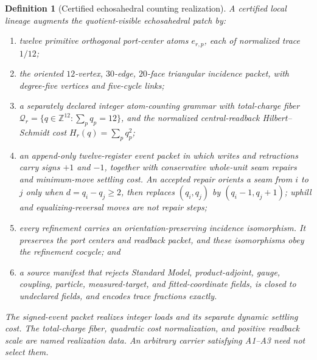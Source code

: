 \documentclass[11pt]{article}
\newtheorem{definition}[theorem]{Definition}
\theoremstyle{remark}
\theoremstyle{plain}
\begin{document}
\begin{definition}[Certified echosahedral counting realization]
\label{def:certified-echosahedral-lineage}
A certified local lineage augments the quotient-visible echosahedral patch by:
\begin{enumerate}[leftmargin=2em,label=\textup{(\roman*)}]
\item twelve primitive orthogonal port-center atoms \(e_{r,p}\), each of
normalized trace \(1/12\);
\item the oriented \(12\)-vertex, \(30\)-edge, \(20\)-face triangular
incidence packet, with degree-five vertices and five-cycle links;
\item a separately declared integer atom-counting grammar with total-charge
fiber \(\mathcal Q_r=\{q\in\mathbb Z^{12}:\sum_pq_p=12\}\), and the
normalized central-readback Hilbert--Schmidt cost
\(H_r(q)=\sum_pq_p^2\);
\item an append-only twelve-register event packet in which writes and
retractions carry signs \(+1\) and \(-1\), together with conservative
whole-unit seam repairs and minimum-move settling cost.  An accepted repair
orients a seam from \(i\) to \(j\) only when
\(d=q_i-q_j\ge2\), then replaces
\((q_i,q_j)\) by \((q_i-1,q_j+1)\); uphill and equalizing-reversal moves are
not repair steps;
\item every refinement carries an orientation-preserving incidence
isomorphism. It preserves the port centers and readback packet, and these
isomorphisms obey the refinement cocycle; and
\item a source manifest that rejects Standard Model, product-adjoint, gauge,
coupling, particle, measured-target, and fitted-coordinate fields, is closed
to undeclared fields, and encodes trace fractions exactly.
\end{enumerate}
The signed-event packet realizes integer loads and its separate dynamic
settling cost. The total-charge fiber, quadratic cost normalization, and
positive readback scale are named realization data. An arbitrary carrier
satisfying A1--A3 need not select them.
\end{definition}
\end{document}
